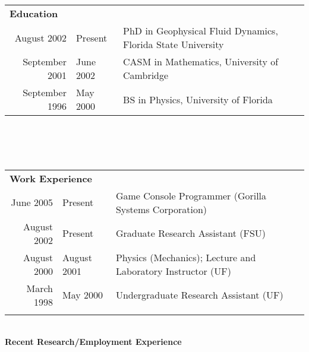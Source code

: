\documentclass[10pt, letterpaper]{article}
\begin{document}
\begin{tabular}{r@{ -- }ll}

\multicolumn{3}{l}{\textbf{Education}} \\

August 2002 & Present      & PhD in Geophysical Fluid Dynamics, Florida State University \\
September 2001 & June 2002 & CASM in Mathematics, University of Cambridge \\
September 1996 & May 2000  & BS in Physics, University of Florida \\
\end{tabular}\\
\\
\\
\begin{tabular}{r@{ -- }ll}
\multicolumn{3}{l}{\bf{Work Experience}} \\

June 2005     & Present     & Game Console Programmer (Gorilla Systems Corporation) \\
August 2002   & Present     & Graduate Research Assistant (FSU) \\
August 2000   & August 2001 & Physics (Mechanics); Lecture and Laboratory Instructor (UF) \\
March 1998    & May 2000    & Undergraduate Research Assistant (UF) \\
\multicolumn{3}{l}{} \\
\end{tabular}
\\
\textbf{Recent Research/Employment Experience} \\
\end{document}
